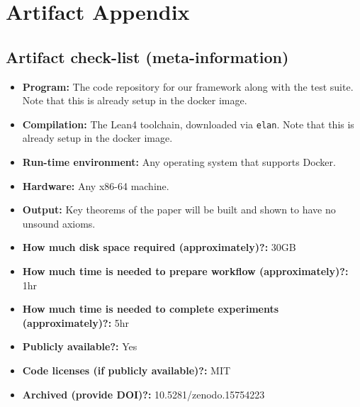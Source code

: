 \documentclass[onecolumn, sigconf, nonacm]{acmart}
\begin{document}


\appendix
\section{Artifact Appendix}



\subsection{Artifact check-list (meta-information)}


{\small
\begin{itemize}
  \item {\bf Program: } The code repository for our framework along with the test suite. Note that this is already setup in the docker image.
  \item {\bf Compilation: } The Lean4 toolchain, downloaded via \texttt{elan}. Note that this is already setup in the docker image.
  \item {\bf Run-time environment: } Any operating system that supports Docker.
  \item {\bf Hardware: } Any x86-64 machine.
  \item {\bf Output: } Key theorems of the paper will be built and shown to have no unsound axioms.
  \item {\bf How much disk space required (approximately)?: } 30GB
  \item {\bf How much time is needed to prepare workflow (approximately)?: } 1hr
  \item {\bf How much time is needed to complete experiments (approximately)?: } 5hr
  \item {\bf Publicly available?: } Yes
  \item {\bf Code licenses (if publicly available)?: } MIT
  \item {\bf Archived (provide DOI)?: } 10.5281/zenodo.15754223
\end{itemize}
}
\end{document}
